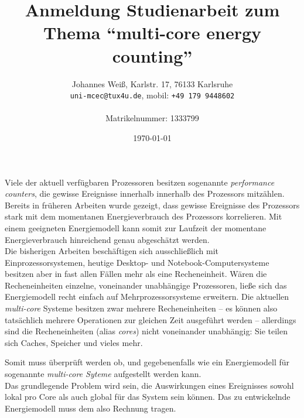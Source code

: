 \documentclass[a4paper,DIV=15]{scrartcl}
\newcommand{\JWemail}[1]{\texttt{#1}}
\newcommand{\JWphone}[1]{\texttt{#1}}
\newcommand{\JWemph}[1]{\emph{#1}}
\newcommand{\JWlone}[1]{}
\begin{document}
\pagestyle{empty}

\title{Anmeldung Studienarbeit zum Thema "`multi-core energy counting"'}
\author{
  Johannes Weiß, Karlstr. 17, 76133 Karlsruhe\\
  \JWemail{uni-mcec@tux4u.de}, mobil: \JWphone{+49 179 9448602}\\
  \\
  Matrikelnummer: 1333799
}
\date{\today}
\maketitle
\thispagestyle{empty}
\pagestyle{empty}

\JWlone{Grundlagen}

Viele der aktuell verfügbaren Prozessoren besitzen sogenannte
\JWemph{performance counters}, die gewisse Ereignisse innerhalb innerhalb des
Prozessors mitzählen. Bereits in früheren Arbeiten wurde gezeigt, dass gewisse
Ereignisse des Prozessors stark mit dem momentanen Energieverbrauch des
Prozessors korrelieren. Mit einem geeigneten Energiemodell kann somit zur
Laufzeit der momentane Energieverbrauch hinreichend genau abgeschätzt werden.\\


\JWlone{Related Work}

Die bisherigen Arbeiten beschäftigen sich ausschließlich mit
Einprozessorsystemen, heutige Desktop- und Notebook-Computersysteme besitzen
aber in fast allen Fällen mehr als eine Recheneinheit. Wären die Recheneinheiten
einzelne, voneinander unabhängige Prozessoren, ließe sich das Energiemodell
recht einfach auf Mehrprozessorsysteme erweitern. Die aktuellen
\JWemph{multi-core} Systeme besitzen zwar mehrere Recheneinheiten -- es können
also tatsächlich mehrere Operationen zur gleichen Zeit ausgeführt werden --
allerdings sind die Recheneinheiten (alias \JWemph{cores}) nicht voneinander
unabhängig: Sie teilen sich Caches, Speicher und vieles mehr.

Somit muss überprüft werden ob, und gegebenenfalls wie ein Energiemodell für
sogenannte \JWemph{multi-core Syteme} aufgestellt werden kann.\\


\JWlone{Problem}

Das grundlegende Problem wird sein, die Auswirkungen eines Ereignisses sowohl
lokal pro Core als auch global für das System sein können. Das zu entwickelnde
Energiemodell muss dem also Rechnung tragen.

\JWlone{Ziele}
\end{document}
